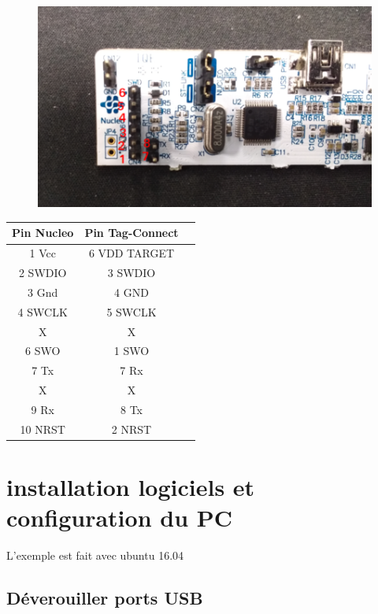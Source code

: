 \documentclass{article}
\begin{document}
\begin{figure}[H]
\begin{center}
\advance\leftskip-3cm
\advance\rightskip-3cm
\includegraphics[keepaspectratio=true,scale=0.5]{Nucleo_pins.png}
\label{visina8}
\end{center}\end{figure}

\begin{center}
 \begin{tabular}{||c | c | c ||} 
 \hline
 Pin Nucleo  & Pin Tag-Connect \\ [0.8ex] 
 \hline\hline
   1 Vcc  & 6 VDD TARGET  \\ 
 \hline
    2 SWDIO & 3 SWDIO \\
 \hline
   3 Gnd & 4 GND \\
 \hline
   4 SWCLK &   5 SWCLK\\
 \hline
  X  & X \\ [1ex] 
 \hline
  6 SWO   &  1 SWO\\ [1ex]
 \hline
  7 Tx    & 7 Rx \\ [1ex] 
 \hline
  X  & X \\ [1ex] 
 \hline
  9 Rx &  8 Tx \\ [1ex] 
 \hline
 10 NRST  & 2 NRST\\ [1ex] 
 \hline
\end{tabular}
\end{center}



\section{installation logiciels et configuration du PC}
L'exemple est fait avec ubuntu 16.04
\subsection{Déverouiller ports USB}
\end{document}
